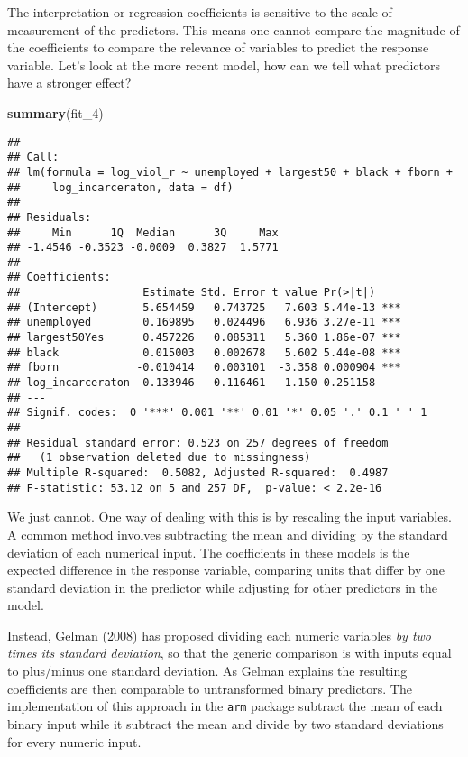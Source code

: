 \documentclass[
]{book}
\newenvironment{Shaded}{\begin{snugshade}}{\end{snugshade}}
\newcommand{\FunctionTok}[1]{\textcolor[rgb]{0.13,0.29,0.53}{\textbf{#1}}}
\newcommand{\NormalTok}[1]{#1}
\begin{document}
The interpretation or regression coefficients is sensitive to the scale of measurement of the predictors. This means one cannot compare the magnitude of the coefficients to compare the relevance of variables to predict the response variable. Let's look at the more recent model, how can we tell what predictors have a stronger effect?

\begin{Shaded}
\begin{Highlighting}[]
\FunctionTok{summary}\NormalTok{(fit\_4)}
\end{Highlighting}
\end{Shaded}

\begin{verbatim}
## 
## Call:
## lm(formula = log_viol_r ~ unemployed + largest50 + black + fborn + 
##     log_incarceraton, data = df)
## 
## Residuals:
##     Min      1Q  Median      3Q     Max 
## -1.4546 -0.3523 -0.0009  0.3827  1.5771 
## 
## Coefficients:
##                   Estimate Std. Error t value Pr(>|t|)    
## (Intercept)       5.654459   0.743725   7.603 5.44e-13 ***
## unemployed        0.169895   0.024496   6.936 3.27e-11 ***
## largest50Yes      0.457226   0.085311   5.360 1.86e-07 ***
## black             0.015003   0.002678   5.602 5.44e-08 ***
## fborn            -0.010414   0.003101  -3.358 0.000904 ***
## log_incarceraton -0.133946   0.116461  -1.150 0.251158    
## ---
## Signif. codes:  0 '***' 0.001 '**' 0.01 '*' 0.05 '.' 0.1 ' ' 1
## 
## Residual standard error: 0.523 on 257 degrees of freedom
##   (1 observation deleted due to missingness)
## Multiple R-squared:  0.5082, Adjusted R-squared:  0.4987 
## F-statistic: 53.12 on 5 and 257 DF,  p-value: < 2.2e-16
\end{verbatim}

We just cannot. One way of dealing with this is by rescaling the input variables. A common method involves subtracting the mean and dividing by the standard deviation of each numerical input. The coefficients in these models is the expected difference in the response variable, comparing units that differ by one standard deviation in the predictor while adjusting for other predictors in the model.

Instead, \href{http://www.stat.columbia.edu/~gelman/research/published/standardizing7.pdf}{Gelman (2008)} has proposed dividing each numeric variables \emph{by two times its standard deviation}, so that the generic comparison is with inputs equal to plus/minus one standard deviation. As Gelman explains the resulting coefficients are then comparable to untransformed binary predictors. The implementation of this approach in the \texttt{arm} package subtract the mean of each binary input while it subtract the mean and divide by two standard deviations for every numeric input.
\end{document}
